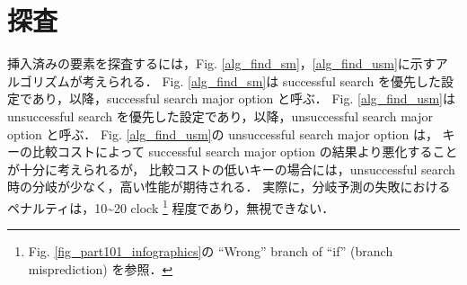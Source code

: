 \leavevmode \newline
\section{探査}

挿入済みの要素を探査するには，Fig. \ref{alg_find_sm}，\ref{alg_find_usm}に示すアルゴリズムが考えられる．
Fig. \ref{alg_find_sm}は successful search を優先した設定であり，以降，successful search major option と呼ぶ．
Fig. \ref{alg_find_usm}は unsuccessful search を優先した設定であり，以降，unsuccessful search major option と呼ぶ．
\samepage\newline\indent
Fig. \ref{alg_find_usm}の unsuccessful search major option は，
キーの比較コストによって successful search major option の結果より悪化することが十分に考えられるが，
比較コストの低いキーの場合には，unsuccessful search 時の分岐が少なく，高い性能が期待される．
実際に，分岐予測の失敗におけるペナルティは，10\textasciitilde 20 clock \footnote
{
  Fig. \ref{fig_part101_infographics}の ``Wrong'' branch of ``if'' (branch misprediction) を参照．
}
程度であり，無視できない．

